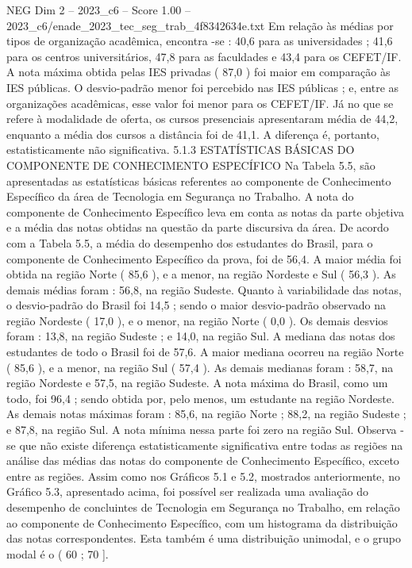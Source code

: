 \begin{textsample}{NEG Dim 2 – 2023\_c6 – Score 1.00 – 2023\_c6/enade\_2023\_tec\_seg\_trab\_4f8342634e.txt}
Em relação às médias por tipos de organização acadêmica, encontra -se : 40,6 para as universidades ; 41,6 para os centros universitários, 47,8 para as faculdades e 43,4 para os CEFET/IF.
A nota máxima obtida pelas IES privadas ( 87,0 ) foi maior em comparação às IES públicas.
O desvio-padrão menor foi percebido nas IES públicas ; e, entre as organizações acadêmicas, esse valor foi menor para os CEFET/IF.
Já no que se refere à modalidade de oferta, os cursos presenciais apresentaram média de 44,2, enquanto a média dos cursos a distância foi de 41,1.
A diferença é, portanto, estatisticamente não significativa. 5.1.3 ESTATÍSTICAS BÁSICAS DO COMPONENTE DE CONHECIMENTO ESPECÍFICO Na Tabela 5.5, são apresentadas as estatísticas básicas referentes ao componente de Conhecimento Específico da área de Tecnologia em Segurança no Trabalho.
A nota do componente de Conhecimento Específico leva em conta as notas da parte objetiva e a média das notas obtidas na questão da parte discursiva da área.
De acordo com a Tabela 5.5, a média do desempenho dos estudantes do Brasil, para o componente de Conhecimento Específico da prova, foi de 56,4.
A maior média foi obtida na região Norte ( 85,6 ), e a menor, na região Nordeste e Sul ( 56,3 ).
As demais médias foram : 56,8, na região Sudeste.
Quanto à variabilidade das notas, o desvio-padrão do Brasil foi 14,5 ; sendo o maior desvio-padrão observado na região Nordeste ( 17,0 ), e o menor, na região Norte ( 0,0 ).
Os demais desvios foram : 13,8, na região Sudeste ; e 14,0, na região Sul.
A mediana das notas dos estudantes de todo o Brasil foi de 57,6.
A maior mediana ocorreu na região Norte ( 85,6 ), e a menor, na região Sul ( 57,4 ).
As demais medianas foram : 58,7, na região Nordeste e 57,5, na região Sudeste.
A nota máxima do Brasil, como um todo, foi 96,4 ; sendo obtida por, pelo menos, um estudante na região Nordeste.
As demais notas máximas foram : 85,6, na região Norte ; 88,2, na região Sudeste ; e 87,8, na região Sul.
A nota mínima nessa parte foi zero na região Sul.
Observa -se que não existe diferença estatisticamente significativa entre todas as regiões na análise das médias das notas do componente de Conhecimento Específico, exceto entre as regiões.
Assim como nos Gráficos 5.1 e 5.2, mostrados anteriormente, no Gráfico 5.3, apresentado acima, foi possível ser realizada uma avaliação do desempenho de concluintes de Tecnologia em Segurança no Trabalho, em relação ao componente de Conhecimento Específico, com um histograma da distribuição das notas correspondentes.
Esta também é uma distribuição unimodal, e o grupo modal é o ( 60 ; 70 ].

\end{textsample}
